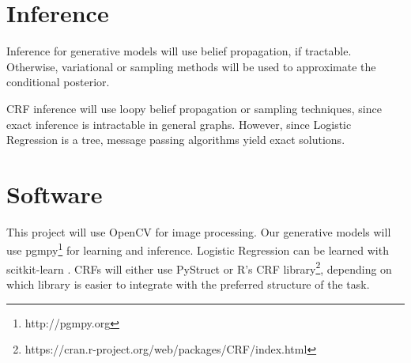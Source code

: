 \documentclass{article}
\begin{document}
\section{Inference}
Inference for generative models will use belief propagation, if tractable.
Otherwise, variational or sampling methods \cite{NUTS} will be
used to approximate the conditional posterior.

CRF inference will use loopy belief propagation or sampling techniques,
since exact inference is intractable in general graphs.
However, since Logistic Regression is a tree, message passing algorithms
yield exact solutions.

\section{Software}
\label{software}
This project will use OpenCV \cite{opencv} for image processing.
Our generative models will use pgmpy\footnote{http://pgmpy.org} for learning
and inference. Logistic Regression can be learned with scitkit-learn \cite{scikit-learn}.
CRFs will either use PyStruct \cite{pystruct} or R's CRF library\footnote{https://cran.r-project.org/web/packages/CRF/index.html},
depending on which library is easier to integrate with the preferred structure of
the task.








\end{document}
